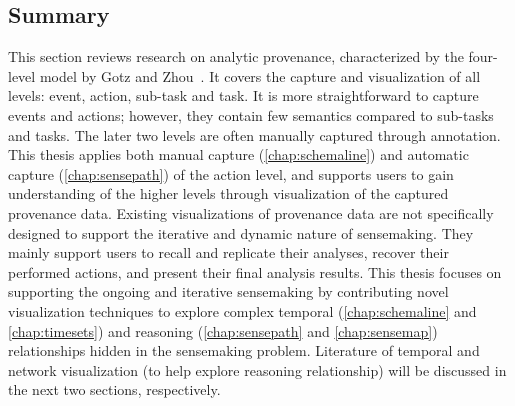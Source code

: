 \subsection{Summary}
This section reviews research on analytic provenance, characterized by the four-level model by Gotz and Zhou~\cite{Gotz2009}. It covers the capture and visualization of all levels: event, action, sub-task and task. It is more straightforward to capture events and actions; however, they contain few semantics compared to sub-tasks and tasks. The later two levels are often manually captured through annotation. This thesis applies both manual capture (\autoref{chap:schemaline}) and automatic capture  (\autoref{chap:sensepath}) of the action level, and supports users to gain understanding of the higher levels through visualization of the captured provenance data. Existing visualizations of provenance data are not specifically designed to support the iterative and dynamic nature of sensemaking. They mainly support users to recall and replicate their analyses, recover their performed actions, and present their final analysis results. This thesis focuses on supporting the ongoing and iterative sensemaking by contributing novel visualization techniques to explore complex temporal (\autoref{chap:schemaline} and \autoref{chap:timesets}) and reasoning (\autoref{chap:sensepath} and \autoref{chap:sensemap}) relationships hidden in the sensemaking problem. Literature of temporal and network visualization (to help explore reasoning relationship) will be discussed in the next two sections, respectively.